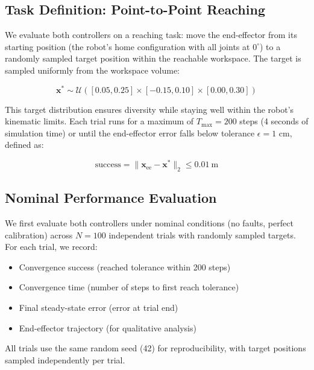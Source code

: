 \documentclass[12pt,a4paper,oneside]{report}
\begin{document}
\subsection{Task Definition: Point-to-Point Reaching}
\label{subsec:task_definition_point_to_point_reaching}

We evaluate both controllers on a reaching task: move the end-effector from its starting position (the robot's home configuration with all joints at $0^\circ$) to a randomly sampled target position within the reachable workspace. The target is sampled uniformly from the workspace volume:

\begin{equation}
\mathbf{x}^* \sim \mathcal{U}([0.05, 0.25] \times [-0.15, 0.10] \times [0.00, 0.30])
\end{equation}

This target distribution ensures diversity while staying well within the robot's kinematic limits. Each trial runs for a maximum of $T_{\text{max}} = 200$ steps (4 seconds of simulation time) or until the end-effector error falls below tolerance $\epsilon = 1$ cm, defined as:

\begin{equation}
\text{success} = \|\mathbf{x}_{\text{ee}} - \mathbf{x}^*\|_2 \leq 0.01\ \text{m}
\end{equation}

\subsection{Nominal Performance Evaluation}
\label{subsec:nominal_performance_evaluation}

We first evaluate both controllers under nominal conditions (no faults, perfect calibration) across $N = 100$ independent trials with randomly sampled targets. For each trial, we record:

\begin{itemize}
    \item Convergence success (reached tolerance within 200 steps)
    \item Convergence time (number of steps to first reach tolerance)
    \item Final steady-state error (error at trial end)
    \item End-effector trajectory (for qualitative analysis)
\end{itemize}

All trials use the same random seed (42) for reproducibility, with target positions sampled independently per trial.
\end{document}
